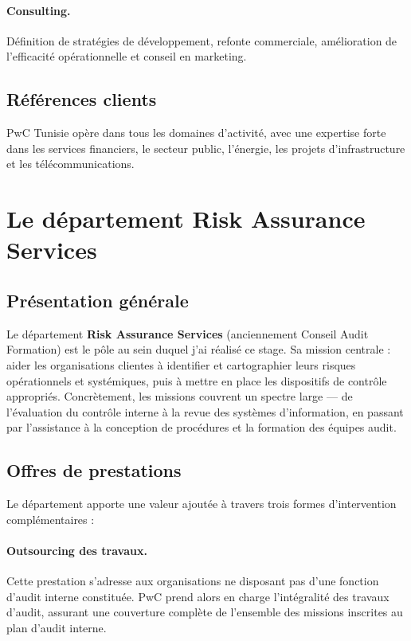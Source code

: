\paragraph{Consulting.}
Définition de stratégies de développement, refonte commerciale, amélioration de
l'efficacité opérationnelle et conseil en marketing.

\subsection{Références clients}

PwC Tunisie opère dans tous les domaines d'activité, avec une expertise forte dans les
services financiers, le secteur public, l'énergie, les projets d'infrastructure et les
télécommunications.

\section{Le département Risk Assurance Services}

\subsection{Présentation générale}

Le département \textbf{Risk Assurance Services} (anciennement Conseil Audit Formation) est
le pôle au sein duquel j'ai réalisé ce stage. Sa mission centrale : aider les organisations
clientes à identifier et cartographier leurs risques opérationnels et systémiques, puis à
mettre en place les dispositifs de contrôle appropriés. Concrètement, les missions couvrent
un spectre large --- de l'évaluation du contrôle interne à la revue des systèmes
d'information, en passant par l'assistance à la conception de procédures et la formation des
équipes audit.

\subsection{Offres de prestations}

Le département apporte une valeur ajoutée à travers trois formes d'intervention
complémentaires :

\paragraph{Outsourcing des travaux.}
Cette prestation s'adresse aux organisations ne disposant pas d'une fonction d'audit interne
constituée. PwC prend alors en charge l'intégralité des travaux d'audit, assurant une
couverture complète de l'ensemble des missions inscrites au plan d'audit interne.

